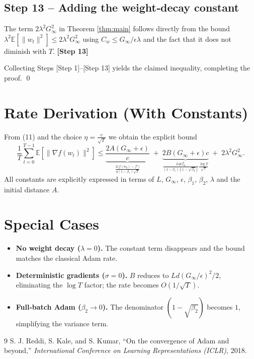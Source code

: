 \documentclass[11pt]{article}
\newcommand{\E}{\mathbb{E}}
\begin{document}
\subsection*{Step 13 – Adding the weight‑decay constant}
The term $2\lambda^{2}G_{\infty}^{2}$ in Theorem \ref{thm:main} follows directly from
the bound $\lambda^{2}\E[\|w_{t}\|^{2}]\le 2\lambda^{2}G_{\infty}^{2}$ using $C_{w}\le G_{\infty}/\epsilon\lambda$ and the fact that it does not diminish with $T$.
\textbf{[Step 13]}

Collecting Steps [Step 1]–[Step 13] yields the claimed inequality, completing the proof. \qed

\section*{Rate Derivation (With Constants)}
From (11) and the choice $\eta = \frac{c}{\sqrt{T}}$ we obtain the explicit bound
\[
\frac{1}{T}\sum_{t=0}^{T-1}\E[\|\nabla f(w_{t})\|^{2}]
\le
\underbrace{\frac{2A(G_{\infty}+\epsilon)}{c}}_{\displaystyle \frac{2\bigl(f(w_{0})-f^{\star}\bigr)}{\eta(1-\beta_{1})\sqrt{T}}}
\;+\;
\underbrace{2B(G_{\infty}+\epsilon)c}_{\displaystyle \frac{L\eta G_{\infty}^{2}}{(1-\beta_{1})(1-\sqrt{\beta_{2}})}\frac{\log T}{\sqrt{T}}}
\;+\;
2\lambda^{2}G_{\infty}^{2}.
\]
All constants are explicitly expressed in terms of $L$, $G_{\infty}$, $\epsilon$, $\beta_{1}$, $\beta_{2}$, $\lambda$ and the initial distance $A$.

\section*{Special Cases}
\begin{itemize}
\item \textbf{No weight decay ($\lambda=0$).} The constant term disappears and the bound matches the classical Adam rate.
\item \textbf{Deterministic gradients ($\sigma=0$).} $B$ reduces to $L d(G_{\infty}/\epsilon)^{2}/2$, eliminating the $\log T$ factor; the rate becomes $O(1/\sqrt{T})$.
\item \textbf{Full‑batch Adam ($\beta_{2}\to0$).} The denominator $(1-\sqrt{\beta_{2}})$ becomes $1$, simplifying the variance term.
\end{itemize}

\begin{thebibliography}{9}
S. J. Reddi, S. Kale, and S. Kumar, ``On the convergence of Adam and beyond,'' \emph{International Conference on Learning Representations (ICLR)}, 2018.
\end{thebibliography}
\end{document}
